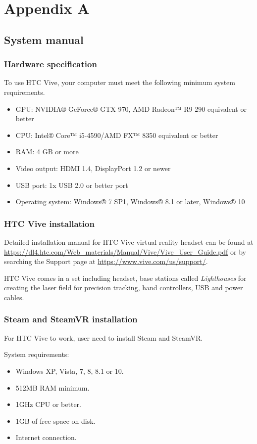 \section*{Appendix A}
\subsection*{System manual}

\subsubsection*{Hardware specification}
To use HTC Vive, your computer must meet the following minimum system requirements.

\begin{itemize}
\item{GPU: NVIDIA® GeForce® GTX 970, AMD Radeon™ R9 290 equivalent or better}
\item{CPU: Intel® Core™ i5-4590/AMD FX™ 8350 equivalent or better}
\item{RAM: 4 GB or more}
\item{Video output: HDMI 1.4, DisplayPort 1.2 or newer}
\item{USB port: 1x USB 2.0 or better port}
\item{Operating system: Windows® 7 SP1, Windows® 8.1 or later, Windows® 10}
\end{itemize}

\subsubsection*{HTC Vive installation}
Detailed installation manual for HTC Vive virtual reality headset can be found at \url{https://dl4.htc.com/Web_materials/Manual/Vive/Vive_User_Guide.pdf} or by searching the Support page at \url{https://www.vive.com/us/support/}.

HTC Vive comes in a set including headset, base stations called \textsl{Lighthouses} for creating the laser field for precision tracking, hand controllers, USB and power cables.

\subsubsection*{Steam and SteamVR installation}
For HTC Vive to work, user need to install \textsf{Steam} and \textsf{SteamVR}.

System requirements:
\begin{itemize}
\item{Windows XP, Vista, 7, 8, 8.1 or 10.}
\item{512MB RAM minimum.}
\item{1GHz CPU or better.}
\item{1GB of free space on disk.}
\item{Internet connection.}
\end{itemize}

